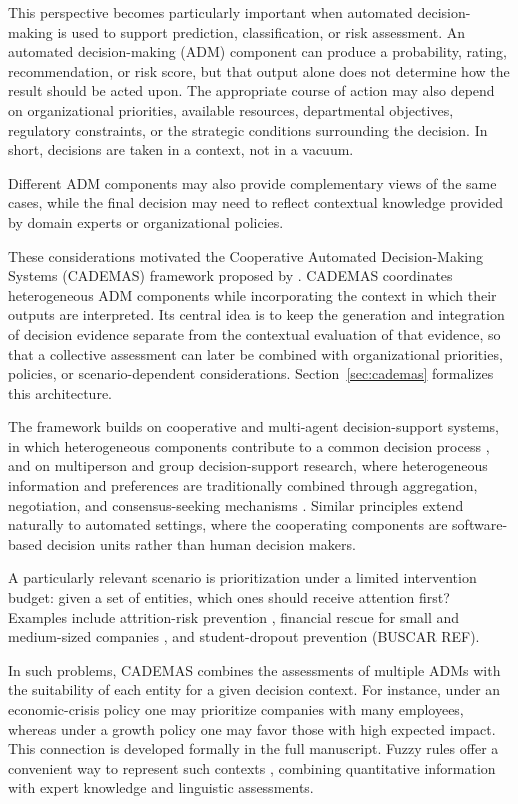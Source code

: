 This perspective becomes particularly important when automated decision-making is used to support prediction, classification, or risk assessment. An automated decision-making (ADM) component can produce a probability, rating, recommendation, or risk score, but that output alone does not determine how the result should be acted upon. The appropriate course of action may also depend on organizational priorities, available resources, departmental objectives, regulatory constraints, or the strategic conditions surrounding the decision. In short, decisions are taken in a context, not in a vacuum.

Different ADM components may also provide complementary views of the same cases, while the final decision may need to reflect contextual knowledge provided by domain experts or organizational policies.

These considerations motivated the Cooperative Automated Decision-Making Systems (CADEMAS) framework proposed by \citet{NovoaHernandez2026}. CADEMAS coordinates heterogeneous ADM components while incorporating the context in which their outputs are interpreted. Its central idea is to keep the generation and integration of decision evidence separate from the contextual evaluation of that evidence, so that a collective assessment can later be combined with organizational priorities, policies, or scenario-dependent considerations. Section~\ref{sec:cademas} formalizes this architecture.

The framework builds on cooperative and multi-agent decision-support systems, in which heterogeneous components contribute to a common decision process \citep{Vahidov2004,bui1999agent}, and on multiperson and group decision-support research, where heterogeneous information and preferences are traditionally combined through aggregation, negotiation, and consensus-seeking mechanisms \citep{Salo1995,HerreraViedma2002}. Similar principles extend naturally to automated settings, where the cooperating components are software-based decision units rather than human decision makers.

A particularly relevant scenario is prioritization under a limited intervention budget: given a set of entities, which ones should receive attention first? Examples include attrition-risk prevention \cite{Godz2026}, financial rescue for small and medium-sized companies \cite{NavarroGalera2025}, and student-dropout prevention (BUSCAR REF).

In such problems, CADEMAS combines the assessments of multiple ADMs with the suitability of each entity for a given decision context. For instance, under an economic-crisis policy one may prioritize companies with many employees, whereas under a growth policy one may favor those with high expected impact. This connection is developed formally in the full manuscript. Fuzzy rules offer a convenient way to represent such contexts \citep{Lamata2020,PerezCanedo2023}, combining quantitative information with expert knowledge and linguistic assessments.

